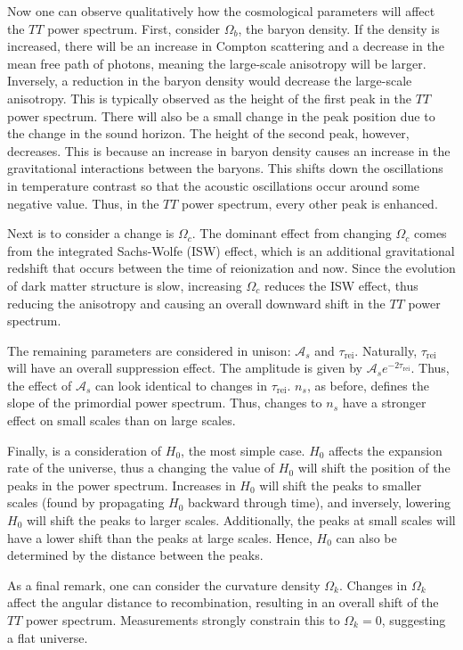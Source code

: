 Now one can observe qualitatively how the cosmological parameters will affect the $TT$ power spectrum. First, consider $\Omega_b$, the baryon density. If the density is increased, there will be an increase in Compton scattering and a decrease in the mean free path of photons, meaning the large-scale anisotropy will be larger. Inversely, a reduction in the baryon density would decrease the large-scale anisotropy. This is typically observed as the height of the first peak in the $TT$ power spectrum. There will also be a small change in the peak position due to the change in the sound horizon. The height of the second peak, however, decreases. This is because an increase in baryon density causes an increase in the gravitational interactions between the baryons. This shifts down the oscillations in temperature contrast so that the acoustic oscillations occur around some negative value. Thus, in the $TT$ power spectrum, every other peak is enhanced.

Next is to consider a change is $\Omega_c$. The dominant effect from changing $\Omega_c$ comes from the integrated Sachs-Wolfe (ISW) effect, which is an additional gravitational redshift that occurs between the time of reionization and now. Since the evolution of dark matter structure is slow, increasing $\Omega_c$ reduces the ISW effect, thus reducing the anisotropy and causing an overall downward shift in the $TT$ power spectrum.

The remaining parameters are considered in unison: $\mathcal{A}_s$ and $\tau_{\mathrm{rei}}$. Naturally, $\tau_{\mathrm{rei}}$ will have an overall suppression effect. The amplitude is given by $\mathcal{A}_se^{-2\tau_{\mathrm{rei}}}$. Thus, the effect of $\mathcal{A}_s$ can look identical to changes in $\tau_\mathrm{rei}$. $n_s$, as before, defines the slope of the primordial power spectrum. Thus, changes to $n_s$ have a stronger effect on small scales than on large scales.

Finally, is a consideration of $H_0$, the most simple case. $H_0$ affects the expansion rate of the universe, thus a changing the value of $H_0$ will shift the position of the peaks in the power spectrum. Increases in $H_0$ will shift the peaks to smaller scales (found by propagating $H_0$ backward through time), and inversely, lowering $H_0$ will shift the peaks to larger scales. Additionally, the peaks at small scales will have a lower shift than the peaks at large scales. Hence, $H_0$ can also be determined by the distance between the peaks.

As a final remark, one can consider the curvature density $\Omega_k$. Changes in $\Omega_k$ affect the angular distance to recombination, resulting in an overall shift of the $TT$ power spectrum. Measurements strongly constrain this to $\Omega_k=0$, suggesting a flat universe.

